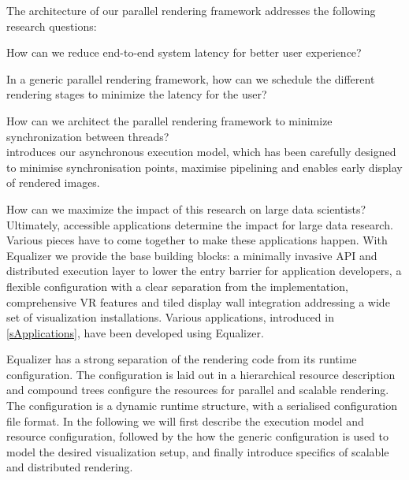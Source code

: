The architecture of our parallel rendering framework addresses the following research questions:
\begin{compactitem}
  \item How can we reduce end-to-end system latency for better user experience?
  \item In a generic parallel rendering framework, how can we schedule the different rendering stages to minimize the latency for the user?
  \item How can we architect the parallel rendering framework to minimize synchronization between threads?\\[\medskipamount]
   introduces our asynchronous execution model, which has been carefully designed to minimise synchronisation points, maximise pipelining and enables early display of rendered images.\\[\medskipamount]

\item How can we maximize the impact of this research on large data
scientists?\\[\medskipamount]

Ultimately, accessible applications determine the impact for large data
research. Various pieces have to come together to make these applications
happen. With Equalizer we provide the base building blocks: a minimally
invasive API and distributed execution layer to lower the entry barrier for
application developers, a flexible configuration with a clear separation from
the implementation, comprehensive VR features and tiled display wall
integration addressing a wide set of visualization installations. Various
applications, introduced in \cref{sApplications}, have been developed using
Equalizer.\\[\medskipamount]

\end{compactitem}

Equalizer has a strong separation of the rendering code from its runtime
configuration. The configuration is laid out in a hierarchical resource
description and compound trees configure the resources for parallel and
scalable rendering. The configuration is a dynamic runtime structure, with a
serialised configuration file format. In the following we will first describe
the execution model and resource configuration, followed by the how the generic
configuration is used to model the desired visualization setup, and finally
introduce specifics of scalable and distributed rendering.

